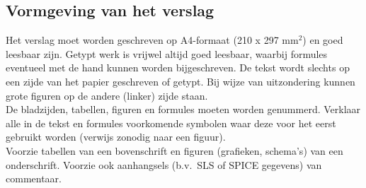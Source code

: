 \subsection{Vormgeving van het verslag }

Het verslag moet worden geschreven op A4-formaat (210 x 297 mm$^2$) en goed 
leesbaar zijn. Getypt werk is vrijwel altijd goed leesbaar, waarbij formules  
eventueel met de hand kunnen worden bijgeschreven. De tekst wordt slechts op een
zijde van het papier geschreven of getypt. Bij wijze van uitzondering kunnen 
grote figuren op de andere (linker) zijde staan. \\
De bladzijden, tabellen, figuren en formules moeten worden genummerd. Verklaar 
alle in de tekst en formules voorkomende symbolen waar deze voor het eerst
gebruikt worden (verwijs zonodig naar een figuur). \\
Voorzie tabellen van een bovenschrift en figuren (grafieken, schema's) van een 
onderschrift. Voorzie ook aanhangsels (b.v.\ SLS of SPICE gegevens) van commentaar. 

\cleardoublepage
